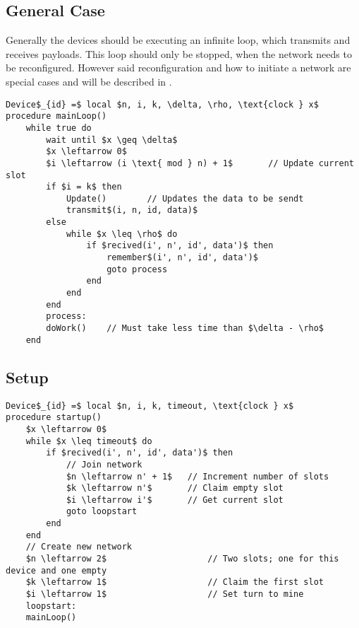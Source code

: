 \subsection{General Case} %
\label{sub:general_case}
Generally the devices should be executing an infinite loop, which transmits and receives payloads.
This loop should only be stopped, when the network needs to be reconfigured.
However said reconfiguration and how to initiate a network are special cases and will be described in .

\begin{lstlisting}[style=pseudocode,mathescape=true,caption={Pseudocode example of the main loop}] 
Device$_{id} =$ local $n, i, k, \delta, \rho, \text{clock } x$ 
procedure mainLoop()
	while true do
		wait until $x \geq \delta$
		$x \leftarrow 0$
		$i \leftarrow (i \text{ mod } n) + 1$		// Update current slot
		if $i = k$ then
			Update()		// Updates the data to be sendt
			transmit$(i, n, id, data)$
		else 
			while $x \leq \rho$ do
				if $recived(i', n', id', data')$ then
					remember$(i', n', id', data')$
					goto process
				end
			end
		end
		process:
		doWork()	// Must take less time than $\delta - \rho$	
	end
\end{lstlisting}  


\subsection{Setup} %
\label{sub:setup} 

\begin{lstlisting}[style=pseudocode,mathescape=true,caption={Pseudocode example of special case functions}]
Device$_{id} =$ local $n, i, k, timeout, \text{clock } x$
procedure startup()
	$x \leftarrow 0$
	while $x \leq timeout$ do
		if $recived(i', n', id', data')$ then
			// Join network
			$n \leftarrow n' + 1$	// Increment number of slots
			$k \leftarrow n'$		// Claim empty slot
			$i \leftarrow i'$		// Get current slot
			goto loopstart
		end
	end
	// Create new network
	$n \leftarrow 2$					// Two slots; one for this device and one empty
	$k \leftarrow 1$					// Claim the first slot
	$i \leftarrow 1$					// Set turn to mine
	loopstart:
	mainLoop()
\end{lstlisting}   
